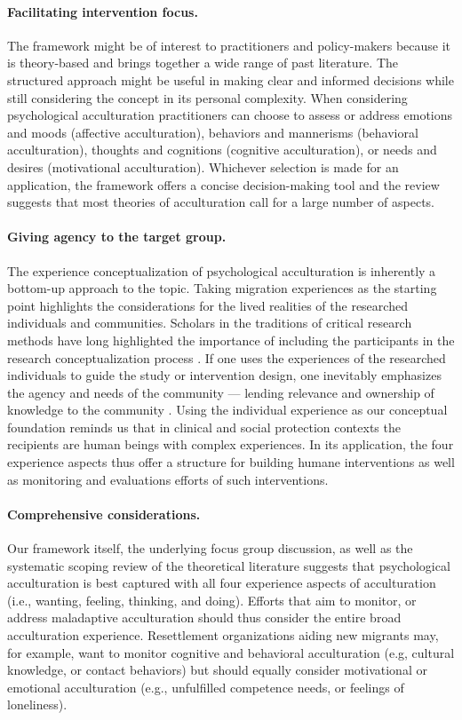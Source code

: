 \documentclass[man, 12pt, a4paper, mask]{apa7}
\begin{document}
\paragraph{Facilitating intervention focus.} The framework might be of interest to practitioners and policy-makers because it is theory-based and brings together a wide range of past literature. The structured approach might be useful in making clear and informed decisions while still considering the concept in its personal complexity. When considering psychological acculturation practitioners can choose to assess or address emotions and moods (affective acculturation), behaviors and mannerisms (behavioral acculturation), thoughts and cognitions (cognitive acculturation), or needs and desires (motivational acculturation). Whichever selection is made for an application, the framework offers a concise decision-making tool and the review suggests that most theories of acculturation call for a large number of aspects.

\paragraph{Giving agency to the target group.} The experience conceptualization of psychological acculturation is inherently a bottom-up approach to the topic. Taking migration experiences as the starting point highlights the considerations for the lived realities of the researched individuals and communities. Scholars in the traditions of critical research methods have long highlighted the importance of including the participants in the research conceptualization process \citep[e.g.,][]{Kovach2009}. If one uses the experiences of the researched individuals to guide the study or intervention design, one inevitably emphasizes the agency and needs of the community --- lending relevance and ownership of knowledge to the community \citep[e.g., ][]{Schmidt2021}. Using the individual experience as our conceptual foundation reminds us that in clinical and social protection contexts the recipients are human beings with complex experiences. In its application, the four experience aspects thus offer a structure for building humane interventions as well as monitoring and evaluations efforts of such interventions. 

\paragraph{Comprehensive considerations.} Our framework itself, the underlying focus group discussion, as well as the systematic scoping review of the theoretical literature suggests that psychological acculturation is best captured with all four experience aspects of acculturation (i.e., wanting, feeling, thinking, and doing). Efforts that aim to monitor, or address maladaptive acculturation should thus consider the entire broad acculturation experience. Resettlement organizations aiding new migrants may, for example, want to monitor cognitive and behavioral acculturation (e.g, cultural knowledge, or contact behaviors) but should equally consider motivational or emotional acculturation (e.g., unfulfilled competence needs, or feelings of loneliness). 
\end{document}
